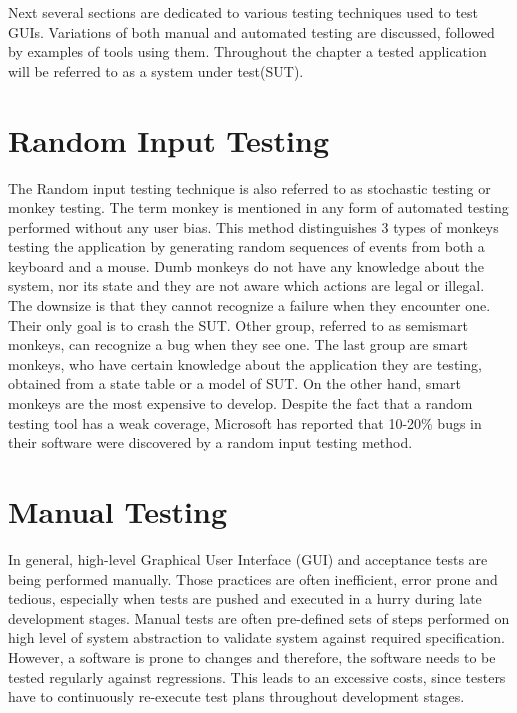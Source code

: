 Next several sections are dedicated to various testing techniques used to test GUIs. Variations of both manual and automated testing are discussed, followed by examples of tools using them.  Throughout the chapter a tested application will be referred to as a system under test(SUT).


\section{Random Input Testing}
The Random input testing technique is also referred to as stochastic testing or monkey testing. The term monkey is mentioned in any form of automated testing performed without any user bias. This method distinguishes 3 types of monkeys testing the application by generating random sequences of events from both a keyboard and a mouse. Dumb monkeys do not have any knowledge about the system, nor its state and they are not aware which actions are legal or illegal. The downsize is that they cannot recognize a failure when they encounter one. Their only goal is to crash the SUT. Other group, referred to as semismart monkeys, can recognize a bug when they see one. The last group are smart monkeys, who have certain knowledge about the application they are testing, obtained from a state table or a model of SUT. On the other hand, smart monkeys are the most expensive to develop. Despite the fact that a random testing tool has a weak coverage, Microsoft has reported that 10-20\% bugs in their software were discovered by a  random input testing method.\cite{nyman}

\section{Manual Testing}
In general, high-level Graphical User Interface (GUI) and acceptance tests are being performed manually. Those practices are often inefficient, error prone and tedious, especially when tests are pushed and executed in a hurry during late development stages. Manual tests are often pre-defined sets of steps performed on high level of system abstraction to validate system against required specification. However, a software is prone to changes and therefore, the software needs to be tested regularly against regressions. This leads to an excessive costs, since testers have to continuously re-execute test plans throughout development stages.\cite{guitesting}

